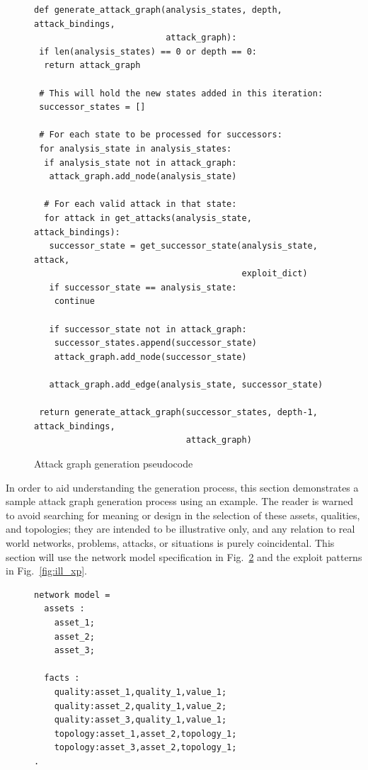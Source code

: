 \begin{figure}
\begin{lstlisting}
def generate_attack_graph(analysis_states, depth, attack_bindings,
                          attack_graph):
 if len(analysis_states) == 0 or depth == 0:
  return attack_graph
 
 # This will hold the new states added in this iteration:
 successor_states = []

 # For each state to be processed for successors:
 for analysis_state in analysis_states:
  if analysis_state not in attack_graph:
   attack_graph.add_node(analysis_state)

  # For each valid attack in that state:
  for attack in get_attacks(analysis_state, attack_bindings):
   successor_state = get_successor_state(analysis_state, attack,
                                         exploit_dict)
   if successor_state == analysis_state:
    continue
       
   if successor_state not in attack_graph:
    successor_states.append(successor_state)
    attack_graph.add_node(successor_state)
   
   attack_graph.add_edge(analysis_state, successor_state)
      
 return generate_attack_graph(successor_states, depth-1, attack_bindings,
                              attack_graph)
\end{lstlisting}
\label{fig:ag_generation_pc}
\caption{Attack graph generation pseudocode}
\end{figure}
In order to aid understanding the generation process, this section demonstrates a
sample attack graph generation process using an example. The reader is warned to
avoid searching for meaning or design in the selection of these assets, qualities,
and topologies; they are intended to be illustrative only, and any relation to 
real world networks, problems, attacks, or situations is purely coincidental.
This section will use the network model specification in Fig.~\ref{fig:ill_nm}
and the exploit patterns in Fig.~\ref{fig:ill_xp}.
\begin{figure}
\begin{lstlisting}
network model = 
  assets :
    asset_1;
    asset_2;
    asset_3;

  facts :
    quality:asset_1,quality_1,value_1;
    quality:asset_2,quality_1,value_2;
    quality:asset_3,quality_1,value_1;
    topology:asset_1,asset_2,topology_1;
    topology:asset_3,asset_2,topology_1;
.
\end{lstlisting}
\label{fig:ill_nm}
\end{figure}

